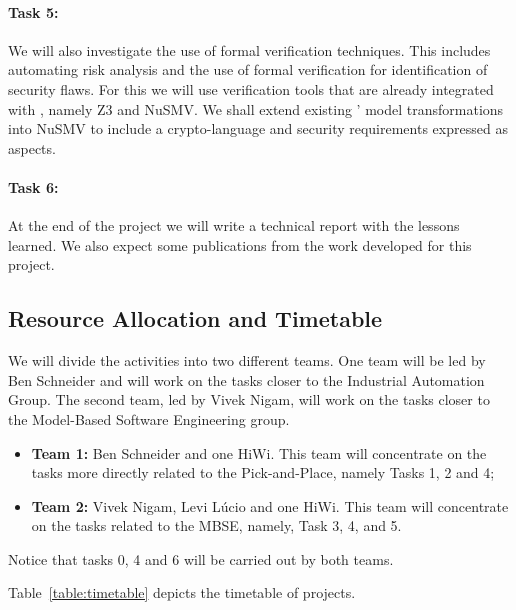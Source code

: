 \paragraph{Task 5:} We will also investigate the use of formal verification
techniques. This includes automating risk analysis and the use of
formal verification for identification of security flaws. For this we will use
verification tools that are already integrated with \autofocus, namely Z3 and
NuSMV. We shall extend existing \autofocus' model transformations into NuSMV
to include a crypto-language and security requirements expressed as aspects.

\paragraph{Task 6:} At the end of the project we will write a technical report
with the lessons learned. We also expect some publications from the work developed for
this project.


\subsection{Resource Allocation and Timetable}

We will divide the activities into two different teams. One team will be led by
Ben Schneider and will work on the tasks closer to the Industrial Automation
Group. The second team, led by Vivek Nigam, will work on the tasks
closer to the Model-Based Software Engineering group.

\begin{itemize}
  \item \textbf{Team 1:} Ben Schneider and one HiWi. This team will concentrate on the tasks more directly related to the Pick-and-Place, namely Tasks 1, 2 and 4;
  \item \textbf{Team 2:} Vivek Nigam, Levi Lúcio and one HiWi. This team will
  concentrate on the tasks related to the MBSE, namely, Task 3, 4, and 5.
\end{itemize}
Notice that tasks 0, 4 and 6 will be carried out by both teams.

Table~\ref{table:timetable} depicts the timetable of projects.  

